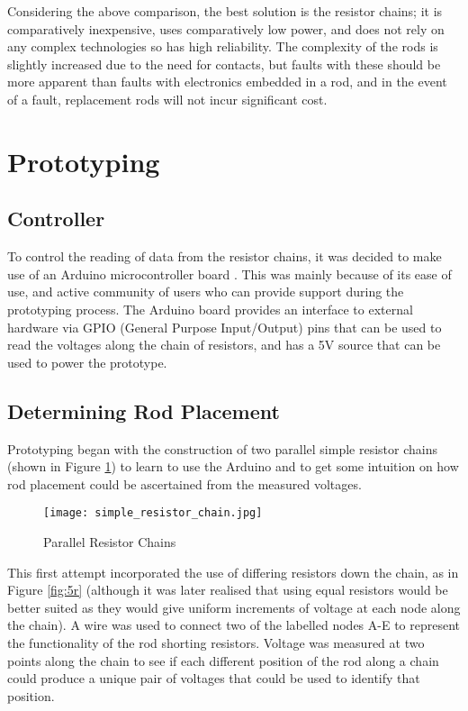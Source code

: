  
Considering the above comparison, the best solution is the resistor chains; it is comparatively inexpensive, uses comparatively low power, and does not rely on any complex technologies so has high reliability. The complexity of the rods is slightly increased due to the need for contacts, but faults with these should be more apparent than faults with electronics embedded in a rod, and in the event of a fault, replacement rods will not incur significant cost.\\




\section{Prototyping}

\subsection{Controller}
To control the reading of data from the resistor chains, it was decided to make use of an Arduino microcontroller board \cite{ArduinoH73:online}. This was mainly because of its ease of use, and active community of users who can provide support during the prototyping process. The Arduino board provides an interface to external hardware via GPIO (General Purpose Input/Output) pins that can be used to read the voltages along the chain of resistors, and has a 5V source that can be used to power the prototype. 

\subsection{Determining Rod Placement}
\label{sec:voltages}
Prototyping began with the construction of two parallel simple resistor chains (shown in Figure \ref{fig:simple_resistor}) to learn to use the Arduino and to get some intuition on how rod placement could be ascertained from the measured voltages. 

\begin{figure}[H]
	\begin{center}
	\texttt{[image: simple\_resistor\_chain.jpg]}\\
  	\caption{Parallel Resistor Chains}
    \label{fig:simple_resistor}
    \end{center}
\end{figure}

This first attempt incorporated the use of differing resistors down the chain, as in Figure \ref{fig:5r} (although it was later realised that using equal resistors would be better suited as they would give uniform increments of voltage at each node along the chain). A wire was used to connect two of the labelled nodes A-E to represent the functionality of the rod shorting resistors. Voltage was measured at two points along the chain to see if each different position of the rod along a chain could produce a unique pair of voltages that could be used to identify that position.  \\



